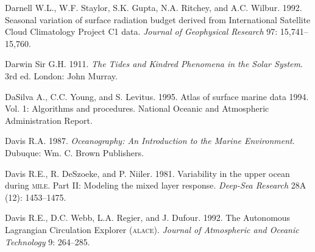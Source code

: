 \begin{thebibliography}{999}
Darnell W.L., W.F. Staylor, S.K. Gupta, N.A. Ritchey, and A.C. Wilbur.
1992. Seasonal variation of surface radiation budget derived from
International Satellite Cloud Climatology Project C1
data. \textit{Journal of Geophysical Research} 97: 15,741--15,760.
%

Darwin Sir G.H.  1911. \textit{The Tides and Kindred Phenomena in the
  Solar System}. 3rd ed.  London: John Murray.
%

DaSilva A., C.C. Young, and S. Levitus.  1995. Atlas of surface marine
data 1994. Vol. 1: Algorithms and procedures. National Oceanic and
Atmospheric Administration Report.
%

Davis R.A.  1987. \textit{Oceanography: An Introduction to the Marine
  Environment}. Dubuque: Wm. C. Brown Publishers.
%

Davis R.E., R. DeSzoeke, and P. Niiler.  1981. Variability in the
upper ocean during \textsc{mile}. Part II: Modeling the mixed layer
response. \textit{Deep-Sea Research} 28A (12): 1453--1475.
%

Davis R.E., D.C. Webb, L.A. Regier, and J. Dufour.  1992. The
Autonomous Lagrangian Circulation Explorer
(\textsc{alace}). \textit{Journal of Atmospheric and Oceanic
  Technology} 9: 264--285.
%


\end{thebibliography}
